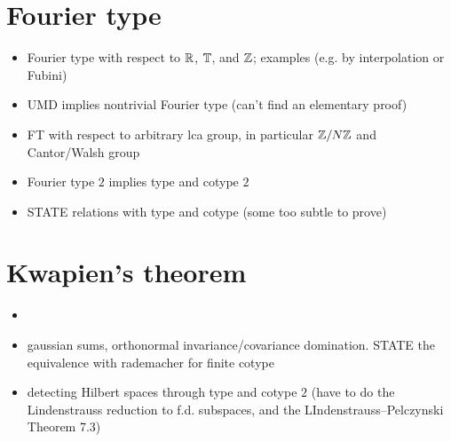 

\section{Fourier type}

\begin{itemize}
\item Fourier type with respect to $\mathbb{R}$, $\mathbb{T}$, and $\mathbb{Z}$; examples (e.g. by interpolation or Fubini)
\item UMD implies nontrivial Fourier type (can't find an elementary proof)
\item FT with respect to arbitrary lca group, in particular $\mathbb{Z}/N\mathbb{Z}$ and Cantor/Walsh group
\item Fourier type $2$ implies type and cotype $2$
\item STATE relations with type and cotype (some too subtle to prove)
\end{itemize}

\section{Kwapien's theorem}

\begin{itemize}
\item \item gaussian sums, orthonormal invariance/covariance
  domination. STATE the equivalence with rademacher for finite cotype
\item detecting Hilbert spaces through type and cotype $2$ (have to do the Lindenstrauss reduction to f.d. subspaces, and the LIndenstrauss--Pelczynski Theorem 7.3)
\end{itemize}


